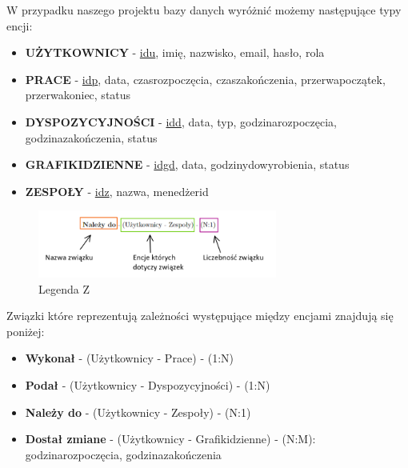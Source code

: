W przypadku naszego projektu bazy danych wyróżnić możemy następujące typy encji:
\begin{itemize}
    \item \textbf{UŻYTKOWNICY} - \underline{id\textunderscore{}u}, imię, nazwisko, email, hasło, rola
    \item \textbf{PRACE} - \underline{id\textunderscore{}p}, data, czas\textunderscore{}rozpoczęcia, czas\textunderscore{}zakończenia, przerwa\textunderscore{}początek, przerwa\textunderscore{}koniec, status
    \item \textbf{DYSPOZYCYJNOŚCI} - \underline{id\textunderscore{}d}, data, typ, godzina\textunderscore{}rozpoczęcia, godzina\textunderscore{}zakończenia, status
    \item \textbf{GRAFIKI\textunderscore{}DZIENNE} - \underline{id\textunderscore{}gd}, data, godziny\textunderscore{}do\textunderscore{}wyrobienia, status
    \item \textbf{ZESPOŁY} - \underline{id\textunderscore{}z}, nazwa, menedżer\textunderscore{}id
\end{itemize}

\begin{figure}[htbp]
    \centering
    \includegraphics[width=0.7\textwidth]{Rozdziały/Opis zaprojektowanego systemu/Podrozdziały/LegendaZwiązki.png}  %
    \caption{Legenda Z}  %
    \label{fig:nazwa_etkiety}  %
\end{figure}

Związki które reprezentują zależności występujące między encjami znajdują się poniżej:



\begin{itemize}
    \item  \textbf{Wykonał} - (Użytkownicy - Prace) - (1:N) 
    \item  \textbf{Podał} - (Użytkownicy - Dyspozycyjności) - (1:N)  
    \item \textbf{Należy do} - (Użytkownicy - Zespoły) - (N:1) 
    \item  \textbf{Dostał zmiane} - (Użytkownicy - Grafiki\textunderscore{}dzienne) - (N:M): godzina\textunderscore{}rozpoczęcia, godzina\textunderscore{}zakończenia
\end{itemize}

